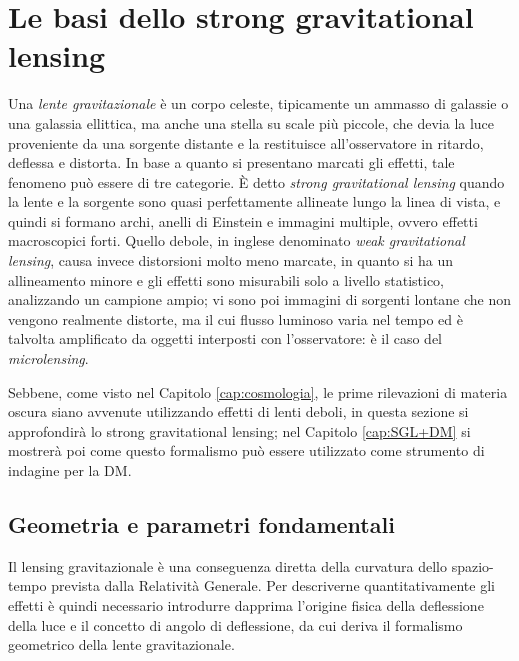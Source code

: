\chapter[Le basi dello strong gravitational lensing]{Le basi dello strong gravitational \\lensing}
\label{cap:SGL}
Una \emph{lente gravitazionale} è un corpo celeste, tipicamente un ammasso di galassie o una galassia ellittica, ma anche una stella su scale più piccole, che devia la luce proveniente da una sorgente distante e la restituisce all'osservatore in ritardo, deflessa e distorta. In base a quanto si presentano marcati gli effetti, tale fenomeno può essere di tre categorie.
È detto \emph{strong gravitational lensing} quando la lente e la sorgente sono quasi perfettamente allineate lungo la linea di vista, e quindi si formano archi, anelli di Einstein e immagini multiple, ovvero effetti macroscopici forti.
Quello debole, in inglese denominato \emph{weak gravitational lensing}, causa invece distorsioni molto meno marcate, in quanto si ha un allineamento minore e gli effetti sono misurabili solo a livello statistico, analizzando un campione ampio; vi sono poi immagini di sorgenti lontane che non vengono realmente distorte, ma il cui flusso luminoso varia nel tempo ed è talvolta amplificato da oggetti interposti con l'osservatore: è il caso del \emph{microlensing}.

Sebbene, come visto nel Capitolo \ref{cap:cosmologia}, le prime rilevazioni di materia oscura siano avvenute utilizzando effetti di lenti deboli, in questa sezione si approfondirà lo strong gravitational lensing; nel Capitolo \ref{cap:SGL+DM} si mostrerà poi come questo formalismo può essere utilizzato come strumento di indagine per la DM.
\section{Geometria e parametri fondamentali}
Il lensing gravitazionale è una conseguenza diretta della curvatura dello spazio-tempo prevista dalla Relatività Generale. Per descriverne quantitativamente gli effetti è quindi necessario introdurre dapprima l'origine fisica della deflessione della luce e il concetto di angolo di deflessione, da cui deriva il formalismo geometrico della lente gravitazionale.
